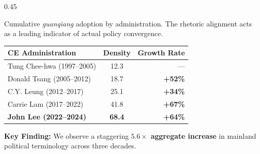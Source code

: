 \documentclass[final,table]{beamer} %
\begin{document}
\begin{frame}[t]
\begin{columns}[T]
\begin{column}{0.45\textwidth}
\begin{tcolorbox}[posterbox={2}{Methods}]
\begin{center}
            \end{center}
        \end{tcolorbox}

        \vspace{2cm}

        \begin{tcolorbox}[posterbox={4}{Comparative Analysis}]
            Cumulative \textit{guanqiang} adoption by administration. The rhetoric alignment acts as a leading indicator of actual policy convergence.\\[1.5cm]
            
            \renewcommand{\arraystretch}{2} 
            \begingroup 
            \Large
            \begin{tabular}{@{} l c r @{}}
                \toprule[4pt]
                \textbf{\color{accentmain} CE Administration} & \textbf{\color{accentmain} Density} & \textbf{\color{accentmain} Growth Rate} \\
                \midrule[2pt]
                Tung Chee-hwa (1997--2005) & 12.3 & — \\
                Donald Tsang (2005--2012) & 18.7 & \textbf{\textcolor{green!60!black}{+52\%}} \\
                C.Y. Leung (2012--2017) & 25.1 & \textbf{\textcolor{green!60!black}{+34\%}} \\
                Carrie Lam (2017--2022) & 41.8 & \textbf{\textcolor{green!60!black}{+67\%}} \\
                \rowcolor{accentmain!10}
                \textbf{John Lee (2022--2024)} & \textbf{68.4} & \textbf{\textcolor{green!60!black}{+64\%}} \\
                \bottomrule[4pt]
            \end{tabular}
            \endgroup
            
            \vspace{2cm}
            \begin{tcolorbox}[colback=white, colframe=accentline, boxrule=2pt, arc=10pt, left=1cm, right=1cm, top=1cm, bottom=1cm]
                \centering \textbf{Key Finding:} We observe a staggering \textbf{$5.6\times$ aggregate increase} in mainland political terminology across three decades.
            \end{tcolorbox}
        \end{tcolorbox}


\end{column}
\end{columns}
\end{frame}
\end{document}
